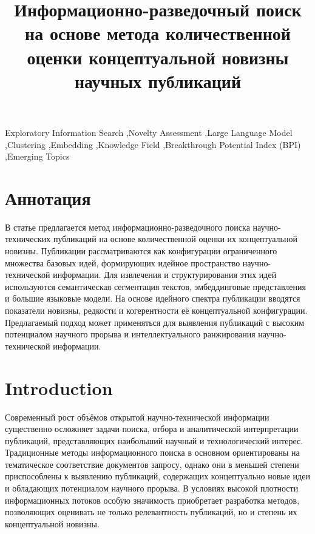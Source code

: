 \documentclass[review,3p,times]{elsarticle}
\begin{document}
\begin{frontmatter}

\title{Информационно-разведочный поиск на основе метода количественной оценки концептуальной новизны научных публикаций}



\begin{keyword}
Exploratory Information Search \sep Novelty Assessment \sep Large Language Model \sep Clustering \sep Embedding \sep Knowledge Field \sep Breakthrough Potential Index (BPI) \sep Emerging Topics

\end{keyword}





\end{frontmatter}

\section{Аннотация}


В статье предлагается метод информационно-разведочного поиска научно-технических публикаций на основе количественной оценки их концептуальной новизны. Публикации рассматриваются как конфигурации ограниченного множества базовых идей, формирующих идейное пространство научно-технической информации. Для извлечения и структурирования этих идей используются семантическая сегментация текстов, эмбеддинговые представления и большие языковые модели. На основе идейного спектра публикации вводятся показатели новизны, редкости и когерентности её концептуальной конфигурации. Предлагаемый подход может применяться для выявления публикаций с высоким потенциалом научного прорыва и интеллектуального ранжирования научно-технической информации.



\section{Introduction}

Современный рост объёмов открытой научно-технической информации существенно осложняет задачи поиска, отбора и аналитической интерпретации публикаций, представляющих наибольший научный и технологический интерес. Традиционные методы информационного поиска в основном ориентированы на тематическое соответствие документов запросу, однако они в меньшей степени приспособлены к выявлению публикаций, содержащих концептуально новые идеи и обладающих потенциалом научного прорыва. В условиях высокой плотности информационных потоков особую значимость приобретает разработка методов, позволяющих оценивать не только релевантность публикаций, но и степень их концептуальной новизны.
\end{document}
